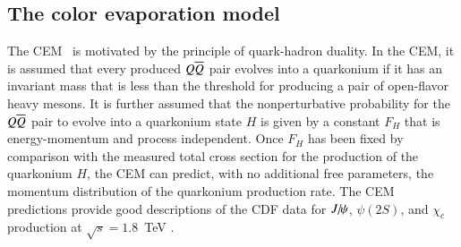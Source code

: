 \subsection{The color evaporation model}  
\label{prod_sec:CEM}

The CEM~\cite{Fritzsch:1977ay,Amundson:1995em,Amundson:1996qr}
is motivated by the principle of quark-hadron duality. In the CEM, it
is assumed that every produced $Q \overline{Q}$ pair evolves into a quarkonium
if it has an invariant mass that is less than the threshold for
producing a pair of open-flavor heavy mesons. It is further assumed that
the nonperturbative probability for the $Q \overline{Q}$ pair to evolve into a
quarkonium state $H$ is given by a constant $F_H$ that is
energy-momentum and process independent. Once $F_H$ has been fixed by
comparison with the measured total cross section for the production of
the quarkonium $H$, the CEM can predict, with no additional free
parameters, the momentum distribution of the quarkonium production rate. The
CEM predictions provide good descriptions of the CDF data for $J\hspace{-.08em}/\hspace{-.14em}\psi$,
$\psi(2S)$, and $\chi_{c}$ production at $\sqrt{s}=1.8$~TeV
\cite{Amundson:1996qr}. 



